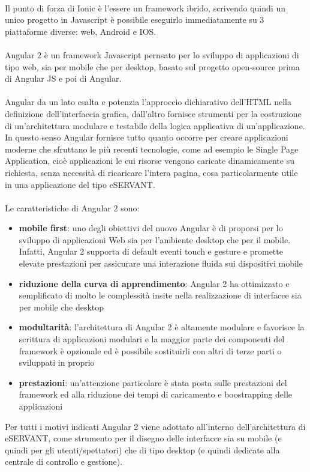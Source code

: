 \paragraph{}

Il punto di forza di Ionic è l’essere un framework ibrido, scrivendo quindi un unico progetto in Javascript è possibile eseguirlo immediatamente su 3 piattaforme diverse: web, Android e IOS.
\paragraph{}

Angular 2 è un framework Javascript pernsato per lo sviluppo di applicazioni di tipo web, sia per mobile che per desktop, basato sul progetto open-source prima di Angular JS e poi di Angular.
\paragraph{}

Angular da un lato esalta e potenzia l’approccio dichiarativo dell’HTML nella definizione
dell’interfaccia grafica, dall’altro fornisce strumenti per la costruzione di un’architettura modulare e testabile della logica applicativa di un’applicazione.
In questo senso Angular fornisce tutto quanto occorre per creare applicazioni moderne che
sfruttano le più recenti tecnologie, come ad esempio le Single Page Application, cioè
applicazioni le cui risorse vengono caricate dinamicamente su richiesta, senza necessità di
ricaricare l’intera pagina, cosa particolarmente utile in una applicazione del tipo eSERVANT.
\paragraph{}

Le caratteristiche di Angular 2 sono:

\begin{itemize}
    \item  \textbf{mobile first}: uno degli obiettivi del nuovo Angular è di proporsi per lo
    sviluppo di applicazioni Web sia per l’ambiente desktop che per il mobile.
    Infatti, Angular 2 supporta di default eventi touch e gesture e promette
    elevate prestazioni per assicurare una interazione fluida sui dispositivi
    mobile
    \item \textbf{riduzione della curva di apprendimento}: Angular 2 ha ottimizzato e
    semplificato di molto le complessità insite nella realizzazione di interfacce
    sia per mobile che desktop
    \item \textbf{modultarità}: l’architettura di Angular 2 è altamente modulare e favorisce la
    scrittura di applicazioni modulari e la maggior parte dei componenti del
    framework è opzionale ed è possibile sostituirli con altri di terze parti o
    sviluppati in proprio
    \item \textbf{prestazioni}: un’attenzione particolare è stata posta sulle prestazioni del
    framework ed alla riduzione dei tempi di caricamento e boostrapping delle
    applicazioni
\end{itemize}

Per tutti i motivi indicati Angular 2 viene adottato all’interno dell’architettura di
eSERVANT, come strumento per il disegno delle interfacce sia su mobile (e quindi per
gli utenti/spettatori) che di tipo desktop (e quindi dedicate alla centrale di controllo e
gestione).
